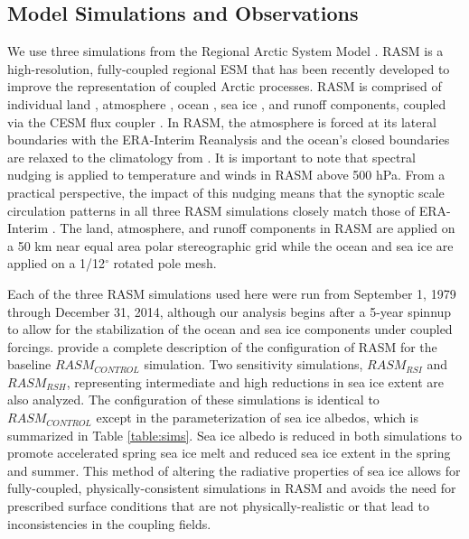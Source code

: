 \subsection{Model Simulations and Observations}
We use three simulations from the Regional Arctic System Model \citep[RASM;][]{Hamman_2016a,Roberts_2015a}.
RASM is a high-resolution, fully-coupled regional ESM that has been recently developed to improve the representation of coupled Arctic processes.
RASM is comprised of individual land \citep[see][]{Hamman_2016a}, atmosphere \citep[see][]{Cassano_2016}, ocean \citep[see][]{Roberts_2015a}, sea ice \citep[see][]{Roberts_2015a}, and runoff \citep[see][]{Hamman_2016b} components, coupled via the CESM flux coupler \citep{Craig_2012}. %
In RASM, the atmosphere is forced at its lateral boundaries with the ERA-Interim Reanalysis \citep{Dee_2011} and the ocean's closed boundaries are relaxed to the climatology from \citet{Steele_2001}.
It is important to note that spectral nudging is applied to temperature and winds in RASM above 500 hPa.
From a practical perspective, the impact of this nudging means that the synoptic scale circulation patterns in all three RASM simulations closely match those of ERA-Interim \citep{Glisan_2013}.
The land, atmosphere, and runoff components in RASM are applied on a 50 km near equal area polar stereographic grid while the ocean and sea ice are applied on a 1/12$^{\circ}$ rotated pole mesh.

Each of the three RASM simulations used here were run from September 1, 1979 through December 31, 2014, although our analysis begins after a 5-year spinnup to allow for the stabilization of the ocean and sea ice components under coupled forcings.
\citet{Hamman_2016b} provide a complete description of the configuration of RASM for the baseline $RASM_{CONTROL}$ simulation.
Two sensitivity simulations, $RASM_{RSI}$ and $RASM_{RSH}$, representing intermediate and high reductions in sea ice extent are also analyzed.
The configuration of these simulations is identical to $RASM_{CONTROL}$ except in the parameterization of sea ice albedos, which is summarized in Table \ref{table:sims}.
Sea ice albedo is reduced in both simulations to promote accelerated spring sea ice melt and reduced sea ice extent in the spring and summer.
This method of altering the radiative properties of sea ice allows for fully-coupled, physically-consistent simulations in RASM and avoids the need for prescribed surface conditions that are not physically-realistic or that lead to inconsistencies in the coupling fields.

